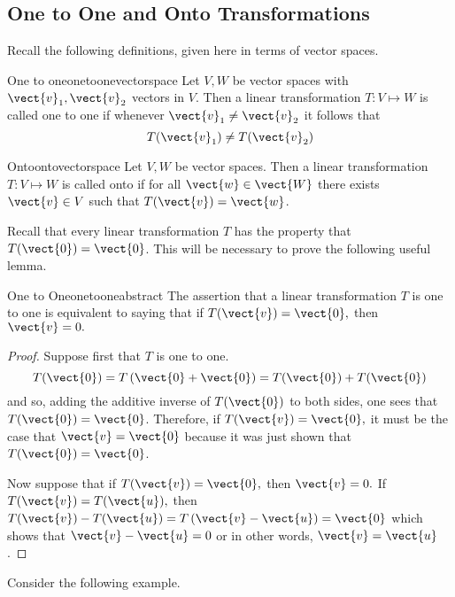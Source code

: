 \subsection{One to One and Onto Transformations}

Recall the following definitions, given here in terms of vector spaces.

\begin{definition}{One to one}{onetoonevectorspace}
Let $V, W$ be vector spaces with $\vect{v}_1, \vect{v}_2$ vectors in $V$. Then a linear transformation $T: V \mapsto W$ is called one to one if whenever $\vect{v}_1 \neq \vect{v}_2$ it follows that 
\[
T(\vect{v}_1) \neq T (\vect{v}_2)
\]
\end{definition}

\begin{definition}{Onto}{ontovectorspace}
Let $V, W$ be vector spaces. Then a linear transformation $T: V \mapsto W$ is called onto if for all $\vect{w} \in \vect{W}$ there exists $\vect{v} \in V$ such that $T(\vect{v}) = \vect{w}$. 
\end{definition}

Recall that every linear transformation $T$ has the property that $T(\vect{0})=\vect{0}$. This will be necessary to prove the following useful lemma. 

\begin{lemma}{One to One}{onetooneabstract}
The assertion that a linear transformation $T$ is one to one is equivalent to
saying that if $T(\vect{v})=\vect{0},$ then $\vect{v}=0.$ 
\end{lemma}

\begin{proof}
Suppose first that $T$ is one to one. 
\begin{equation*}
T(\vect{0})=T\left( \vect{0}+\vect{0}\right) =T(\vect{0})+T(\vect{0})
\end{equation*}
and so, adding the additive inverse of $T(\vect{0})$ to both sides, one sees
that $T(\vect{0})=\vect{0}$. Therefore, if $T(\vect{v})=\vect{0},$ it must be the
case that $\vect{v}=\vect{0}$ because it was just shown that $T(\vect{0})=\vect{0}$.

Now suppose that if $T(\vect{v})=\vect{0},$ then $\vect{v}=0.$ If $T(\vect{v})=T(\vect{u}),$ then $T(\vect{v})-T(\vect{u})=T\left( \vect{v}-\vect{u}\right) =\vect{0}$ which
shows that $\vect{v}-\vect{u}=0$ or in other words, $\vect{v}=\vect{u}$. 
\end{proof}

Consider the following example.

